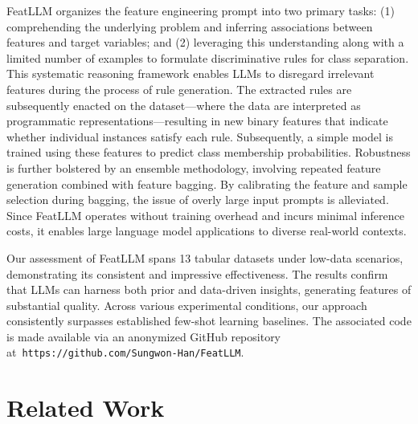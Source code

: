 \textsf{FeatLLM} organizes the feature engineering prompt into two primary tasks: (1) comprehending the underlying problem and inferring associations between features and target variables; and (2) leveraging this understanding along with a limited number of examples to formulate discriminative rules for class separation. This systematic reasoning framework enables LLMs to disregard irrelevant features during the process of rule generation. The extracted rules are subsequently enacted on the dataset—where the data are interpreted as programmatic representations—resulting in new binary features that indicate whether individual instances satisfy each rule. Subsequently, a simple model is trained using these features to predict class membership probabilities. Robustness is further bolstered by an ensemble methodology, involving repeated feature generation combined with feature bagging. By calibrating the feature and sample selection during bagging, the issue of overly large input prompts is alleviated. Since \textsf{FeatLLM} operates without training overhead and incurs minimal inference costs, it enables large language model applications to diverse real-world contexts. 

Our assessment of \textsf{FeatLLM} spans 13 tabular datasets under low-data scenarios, demonstrating its consistent and impressive effectiveness. The results confirm that LLMs can harness both prior and data-driven insights, generating features of substantial quality. Across various experimental conditions, our approach consistently surpasses established few-shot learning baselines. The associated code is made available via an anonymized GitHub repository at~\texttt{https://github.com/Sungwon-Han/FeatLLM}.

\section{Related Work}

